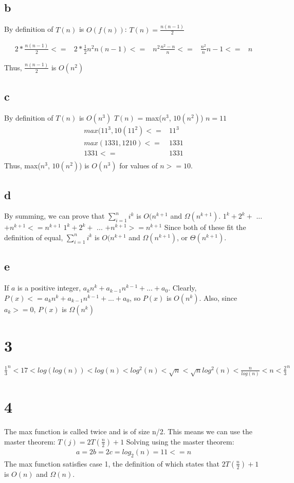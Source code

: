 \documentclass{article}
\begin{document}
\subsection{b}
By definition of $T(n)$ is $O(f(n))$:
$T(n) = \frac{n(n-1)}{2}$

\begin{align}
	2*\frac{n(n-1)}{2} <=&2*\frac{1}{2}n^2
	n(n-1) <=&n^2
	\frac{n^2-n}{n} <=& \frac{n^2}{n}
	n-1 <=& n
\end{align}

Thus, $\frac{n(n-1)}{2}$ is $O(n^2)$

\subsection{c}
By definition of $T(n)$ is $O(n^3)$
$T(n)$ = max($n^3$, $10(n^2)$)
$n = 11$
\begin{align}
	max( 11^3, 10(11^2 ) <=& 11^3\\
	max( 1331, 1210 ) <=& 1331\\
	1331 <=& 1331\\
\end{align}
Thus, max($n^3$, $10(n^2)$) is $O(n^3)$ for values of $n >= 10$.


\subsection{d}
By summing, we can prove that $\sum\limits_{i=1}^{n} i^{k}$ is $O(n^{k+1}$ and $\Omega(n^{k+1})$.
	$1^k + 2^k + $ ... $+ n^{k+1} <= n^{k+1}$
	$1^k + 2^k + $ ... $+ n^{k+1} >= n^{k+1}$
Since both of these fit the definition of equal, $\sum\limits_{i=1}^{n} i^{k}$ is $O(n^{k+1}$ and $\Omega(n^{k+1})$, or $\Theta(n^{k+1})$.

\subsection{e}
If $a$ is a positive integer, $a_{k}n^k + a_{k-1}n^{k-1} + ... + a_{0}$.
Clearly, $P(x) <= a_{k}n^k + a_{k-1}n^{k-1} + ... + a_{0}$, so $P(x)$ is $O(n^k)$.
Also, since $a_{k} >= 0$, $P(x)$ is $\Omega(n^k)$

\section{3}
$\frac{1}{3}^n < 17 < log(log(n)) < log(n) < log^{2}(n) < \sqrt{n} < \sqrt{n}log^{2}(n) < \frac{n}{log(n)} < n < \frac{2}{3}^{n}$

\section{4}
The max function is called twice and is of size n/2. This means we can use the master theorem:
$T(j) = 2T(\frac{n}{2}) + 1$
Solving using the master theorem:
\begin{align}
	a = 2
	b = 2
	c = log_{2}(n) = 1
	1 <= n
\end{align}
The max function satisfies case 1, the definition of which states that $2T(\frac{n}{2}) + 1$ is $O(n)$ and $\Omega(n)$.
\end{document}
